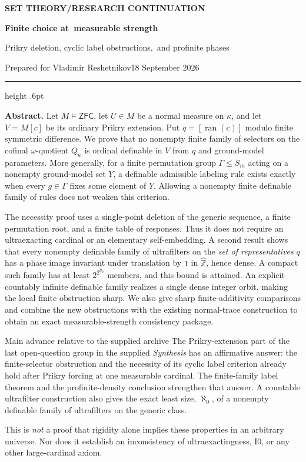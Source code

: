 \documentclass[11pt,letterpaper]{article}
\theoremstyle{definition}
\numberwithin{equation}{section}
\newcommand{\ZFC}{\mathsf{ZFC}}
\newcommand{\ran}{\operatorname{ran}}
\newcommand{\Izero}{\mathrm{I0}}
\newcommand{\zhat}{\widehat{\mathbb Z}}
\begin{document}
\thispagestyle{empty}
{\sffamily\bfseries\small\color{Olive}SET THEORY\quad /\quad RESEARCH CONTINUATION}

\vspace{13pt}
{\fontsize{28}{31}\selectfont\bfseries\color{Forest}Finite choice at\ measurable strength\par}
\vspace{10pt}
{\fontsize{14}{18}\selectfont Prikry deletion, cyclic label obstructions,\ and profinite phases\par}
\vspace{14pt}
{\color{Muted}Prepared for Vladimir Reshetnikov\hfill 18 September 2026\par}
\vspace{3pt}
{\color{Sage}\hrule height .6pt}
\vspace{12pt}

\textbf{Abstract.}
Let $M\models\ZFC$, let $U\in M$ be a normal measure on $\kappa$, and let
$V=M[c]$ be its ordinary Prikry extension. Put
$q=[\ran(c)]$ modulo finite symmetric difference. We prove that no nonempty
finite family of selectors on the cofinal $\omega$-quotient $Q_\kappa$ is
ordinal definable in $V$ from $q$ and ground-model parameters. More generally,
for a finite permutation group $\Gamma\le S_m$ acting on a nonempty ground-model
set $Y$, a definable admissible labeling rule exists exactly when every
$g\in\Gamma$ fixes some element of $Y$. Allowing a nonempty finite definable
family of rules does not weaken this criterion.

The necessity proof uses a single-point deletion of the generic sequence,
a finite permutation root, and a finite table of responses. Thus it does not
require an ultraexacting cardinal or an elementary self-embedding. A second
result shows that every nonempty definable family of ultrafilters on the
\emph{set of representatives} $q$ has a phase image invariant under translation
by $1$ in $\zhat$, hence dense. A compact such family has at least $2^{2^{\aleph_0}}$
members, and this bound is attained. An explicit countably infinite definable family realizes
a single dense integer orbit, making the local finite obstruction sharp.
We also give sharp finite-additivity comparisons and combine
the new obstructions with the existing normal-trace construction to obtain
an exact measurable-strength consistency package.

\begin{assessment}{Main advance relative to the supplied archive}
The Prikry-extension part of the last open-question group in the supplied
\emph{Synthesis} has an affirmative answer: the finite-selector obstruction
and the necessity of its cyclic label criterion already hold after Prikry
forcing at one measurable cardinal. The finite-family label theorem and the
profinite-density conclusion strengthen that answer. A countable
ultrafilter construction also gives the exact least size, $\aleph_0$, of a
nonempty definable family of ultrafilters on the generic class.

This is \emph{not} a proof that rigidity alone implies these properties in
an arbitrary universe. Nor does it establish an inconsistency of
ultraexactingness, $\Izero$, or any other large-cardinal axiom.
\end{assessment}
\end{document}
